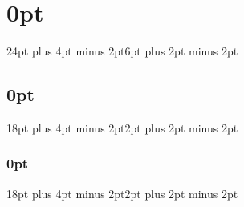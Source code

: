 \setcounter{tocdepth}{3} %


\usepackage{titlesec} 

\titlespacing\section{0pt}
{24pt plus 4pt minus 2pt}{6pt plus 2pt minus 2pt} %

\titlespacing\subsection{0pt}
{18pt plus 4pt minus 2pt}{2pt plus 2pt minus 2pt} %

\titlespacing\subsubsection{0pt}
{18pt plus 4pt minus 2pt}{2pt plus 2pt minus 2pt} %

\setlength\parskip{0.2em plus 0.1em}
\setlength\parindent{15pt}



\let\footruleskip\undefined  %
\usepackage{fancyhdr}
\pagestyle{fancy}
\fancyhf{}


\usepackage{varioref}							%
\usepackage{nameref}							%

